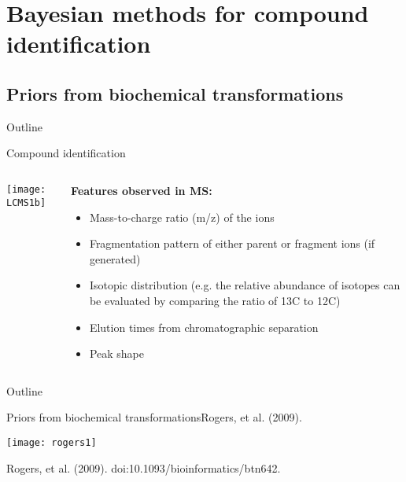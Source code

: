 \documentclass[xcolor=dvipsnames]{beamer}
\begin{document}
\section{Bayesian methods for compound identification}
\subsection{Priors from biochemical transformations}
\begin{frame}{Outline}
	\vspace{-10.5pt}
	\tableofcontents[currentsection,subsectionstyle=hide]
\end{frame}

\begin{frame}{Compound identification}
	\begin{columns}
		\begin{column}{0.45\textwidth}
			\vspace{-35pt}
			\begin{center}
				\texttt{[image: LCMS1b]}
			\end{center}
		\end{column}
		\begin{column}{0.55\textwidth}
			\textbf{Features observed in MS:} \pause
			\begin{itemize}
				\item Mass-to-charge ratio (m/z) of the ions \pause
				\item Fragmentation pattern of either parent or fragment ions (if generated) \pause
				\item Isotopic distribution (e.g. the relative abundance of isotopes can be evaluated by comparing the ratio of 13C to 12C) \pause
				\item Elution times from chromatographic separation \pause
				\item Peak shape
			\end{itemize}
		\end{column}
	\end{columns}
\end{frame}

\begin{frame}{Outline}
	\vspace{-10.5pt}
	\tableofcontents[currentsection,subsectionstyle=show/shaded/hide]
\end{frame}

\begin{frame}{Priors from biochemical transformations}{Rogers, et al. (2009).}
	\vspace{-15pt}
	\begin{center}
		\texttt{[image: rogers1]}
		
		Rogers, et al. (2009). doi:10.1093/bioinformatics/btn642.
	\end{center}
\end{frame}
\end{document}
